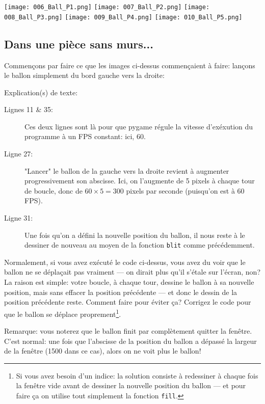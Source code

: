 \documentclass[11pt]{article}
\begin{document}
	\noindent %
	\texttt{[image: 006\_Ball\_P1.png]}
	\hfill
	\texttt{[image: 007\_Ball\_P2.png]}
	\hfill
	\texttt{[image: 008\_Ball\_P3.png]}
	\hfill
	\texttt{[image: 009\_Ball\_P4.png]}
	\hfill
	\texttt{[image: 010\_Ball\_P5.png]}
	
	\subsection*{Dans une pièce sans murs...}
	Commençons par faire ce que les images ci-dessus commençaient à faire: lançons le ballon simplement du bord gauche vers la droite:
	
	
	Explication(s) de texte:
	\begin{description}
		\item[Lignes 11 \& 35:] Ces deux lignes sont là pour que pygame régule la vitesse d'exéxution du programme à un FPS constant: ici, 60.
		\item[Ligne 27:] "Lancer" le ballon de la gauche vers la droite revient à augmenter progressivement son abscisse. Ici, on l'augmente de 5 pixels à chaque tour de boucle, donc de $60 \times 5 = 300$ pixels par seconde (puisqu'on est à 60 FPS).
		\item[Ligne 31:] Une fois qu'on a défini la nouvelle position du ballon, il nous reste à le dessiner de nouveau au moyen de la fonction \texttt{blit} comme précédemment.
	\end{description}
	
	\begin{MonAct}
		Normalement, si vous avez exécuté le code ci-dessus, vous avez du voir que le ballon ne se déplaçait pas vraiment --- on dirait plus qu'il s'étale sur l'écran, non? La raison est simple: votre boucle, à chaque tour, dessine le ballon à sa nouvelle position, mais sans effacer la position précédente --- et donc le dessin de la position précédente reste. Comment faire pour éviter ça? Corrigez le code pour que le ballon se déplace proprement\footnote{Si vous avez besoin d'un indice: la solution consiste à redessiner à chaque fois la fenêtre vide avant de dessiner la nouvelle position du ballon --- et pour faire ça on utilise tout simplement la fonction \texttt{fill}.}.
	\end{MonAct}
	
	Remarque: vous noterez que le ballon finit par complètement quitter la fenêtre. C'est normal: une fois que l'abscisse de la position du ballon a dépassé la largeur de la fenêtre (1500 dans ce cas), alors on ne voit plus le ballon!
	
\end{document}

